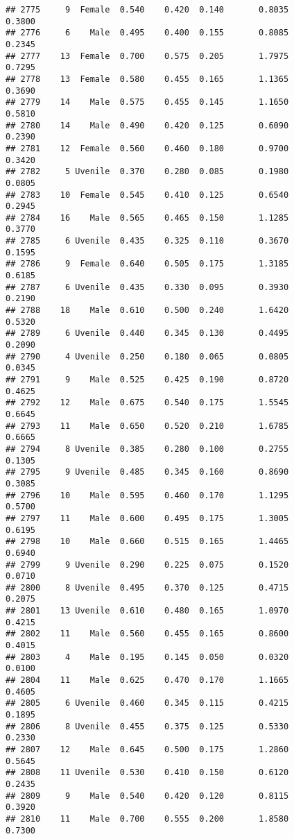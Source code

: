 \documentclass[
]{article}
\begin{document}
\begin{verbatim}
## 2775     9  Female  0.540    0.420  0.140       0.8035         0.3800
## 2776     6    Male  0.495    0.400  0.155       0.8085         0.2345
## 2777    13  Female  0.700    0.575  0.205       1.7975         0.7295
## 2778    13  Female  0.580    0.455  0.165       1.1365         0.3690
## 2779    14    Male  0.575    0.455  0.145       1.1650         0.5810
## 2780    14    Male  0.490    0.420  0.125       0.6090         0.2390
## 2781    12  Female  0.560    0.460  0.180       0.9700         0.3420
## 2782     5 Uvenile  0.370    0.280  0.085       0.1980         0.0805
## 2783    10  Female  0.545    0.410  0.125       0.6540         0.2945
## 2784    16    Male  0.565    0.465  0.150       1.1285         0.3770
## 2785     6 Uvenile  0.435    0.325  0.110       0.3670         0.1595
## 2786     9  Female  0.640    0.505  0.175       1.3185         0.6185
## 2787     6 Uvenile  0.435    0.330  0.095       0.3930         0.2190
## 2788    18    Male  0.610    0.500  0.240       1.6420         0.5320
## 2789     6 Uvenile  0.440    0.345  0.130       0.4495         0.2090
## 2790     4 Uvenile  0.250    0.180  0.065       0.0805         0.0345
## 2791     9    Male  0.525    0.425  0.190       0.8720         0.4625
## 2792    12    Male  0.675    0.540  0.175       1.5545         0.6645
## 2793    11    Male  0.650    0.520  0.210       1.6785         0.6665
## 2794     8 Uvenile  0.385    0.280  0.100       0.2755         0.1305
## 2795     9 Uvenile  0.485    0.345  0.160       0.8690         0.3085
## 2796    10    Male  0.595    0.460  0.170       1.1295         0.5700
## 2797    11    Male  0.600    0.495  0.175       1.3005         0.6195
## 2798    10    Male  0.660    0.515  0.165       1.4465         0.6940
## 2799     9 Uvenile  0.290    0.225  0.075       0.1520         0.0710
## 2800     8 Uvenile  0.495    0.370  0.125       0.4715         0.2075
## 2801    13 Uvenile  0.610    0.480  0.165       1.0970         0.4215
## 2802    11    Male  0.560    0.455  0.165       0.8600         0.4015
## 2803     4    Male  0.195    0.145  0.050       0.0320         0.0100
## 2804    11    Male  0.625    0.470  0.170       1.1665         0.4605
## 2805     6 Uvenile  0.460    0.345  0.115       0.4215         0.1895
## 2806     8 Uvenile  0.455    0.375  0.125       0.5330         0.2330
## 2807    12    Male  0.645    0.500  0.175       1.2860         0.5645
## 2808    11 Uvenile  0.530    0.410  0.150       0.6120         0.2435
## 2809     9    Male  0.540    0.420  0.120       0.8115         0.3920
## 2810    11    Male  0.700    0.555  0.200       1.8580         0.7300

\end{verbatim}
\end{document}
